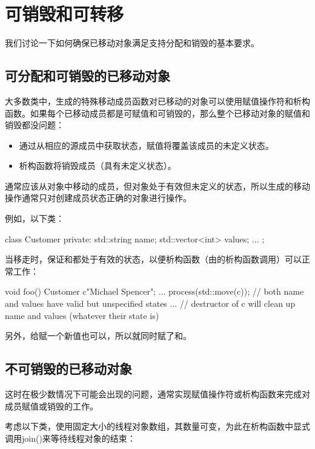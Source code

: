 \section{可销毁和可转移}
我们讨论一下如何确保已移动对象满足支持分配和销毁的基本要求。

\subsection{可分配和可销毁的已移动对象}

大多数类中，生成的特殊移动成员函数对已移动的对象可以使用赋值操作符和析构函数。如果每个已移动成员都是可赋值和可销毁的，那么整个已移动对象的赋值和销毁都没问题：

\begin{itemize}
	\item 通过从相应的源成员中获取状态，赋值将覆盖该成员的未定义状态。
	\item 析构函数将销毁成员（具有未定义状态）。
\end{itemize}

通常应该从对象中移动的成员，但对象处于有效但未定义的状态，所以生成的移动操作通常只对创建成员状态正确的对象进行操作。

例如，以下类：

\begin{cppcode}
class Customer {
private:
	std::string name;
	std::vector<int> values;
	...
};
\end{cppcode}

当移走时，保证和都处于有效的状态，以便析构函数（由的析构函数调用）可以正常工作：

\begin{cppcode}
void foo()
{
	Customer c{"Michael Spencer"};
	...
	process(std::move(c));
	// both name and values have valid but unspecified states
	...
} // destructor of c will clean up name and values (whatever their state is)
\end{cppcode}

另外，给赋一个新值也可以，所以就同时赋了和。

\subsection{不可销毁的已移动对象}

这时在极少数情况下可能会出现的问题，通常实现赋值操作符或析构函数来完成对成员赋值或销毁的工作。

考虑以下类，使用固定大小的线程对象数组，其数量可变，为此在析构函数中显式调用join()来等待线程对象的结束：

